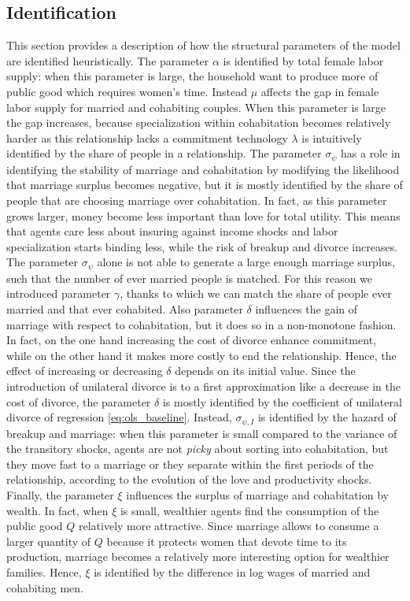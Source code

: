 \documentclass[12pt]{article}
\numberwithin{table}{section}
\begin{document}
\subsection{Identification}
This section provides a description of how the structural parameters of the model are identified  heuristically. The parameter $\alpha$ is identified by total female labor supply: when this parameter is large, the household want to produce more of public good which requires women's time. Instead $\mu$ affects the gap in female labor supply for married and cohabiting couples. When this parameter is large the gap increases, because specialization within cohabitation becomes relatively harder as this relationship lacks a commitment technology $\lambda$ is intuitively identified by the share of people in a relationship.  The parameter $\sigma_{\psi}$ has a role in identifying the stability of marriage and cohabitation by modifying the likelihood that marriage surplus becomes negative, but it is mostly identified by the share of people that are choosing marriage over cohabitation. In fact, as this parameter
grows larger, money become less important than love for total utility. This means that
agents care less about insuring against income shocks and labor specialization starts
binding less, while the risk of breakup and divorce increases. The parameter $\sigma_{\psi}$ alone is not able to generate a large enough marriage surplus, such that the number of ever married people is matched. For this reason we introduced parameter $\gamma$, thanks to which we can match the share of people ever married and that ever cohabited. Also parameter $\delta$ influences the gain of marriage with respect to cohabitation, but it does so in a non-monotone fashion. In fact, on the one hand increasing the cost of divorce enhance commitment, while on the other hand it makes more costly to end the relationship. Hence, the effect of increasing or decreasing $\delta$ depends on its initial value. Since the introduction of unilateral divorce is to a first approximation like a decrease in the cost of divorce, the parameter $\delta$ is mostly identified by the coefficient of unilateral divorce of regression \ref{eq:ols_baseline}. Instead, $\sigma_{\psi,I}$ is identified by the hazard of breakup and marriage: when this parameter is small compared to the variance of the transitory shocks, agents are not \textit{picky} about sorting into cohabitation, but they move fast to a marriage or they separate within the first periods of the relationship, according to the evolution of the love and productivity shocks. Finally, the parameter $\xi$ influences the surplus of marriage and cohabitation by wealth. In fact, when $\xi$ is small, wealthier agents find the consumption of the public good $Q$ relatively more attractive. Since marriage allows to consume a larger quantity of $Q$ because it protects women that devote time to its production, marriage becomes a relatively more interesting option for wealthier families. Hence, $\xi$ is identified by the difference in log wages of married and cohabiting men.
\end{document}
